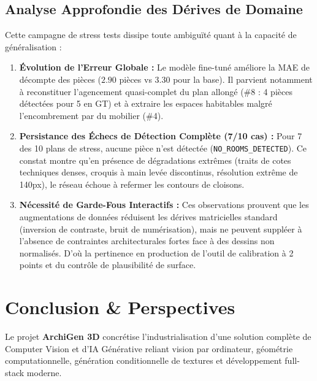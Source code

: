 \documentclass[11pt,a4paper]{report}
\begin{document}
\section{Analyse Approfondie des Dérives de Domaine}
Cette campagne de stress tests dissipe toute ambiguïté quant à la capacité de généralisation :
\begin{enumerate}
    \item \textbf{Évolution de l'Erreur Globale :} Le modèle fine-tuné améliore la MAE de décompte des pièces ($2.90$ pièces vs $3.30$ pour la base). Il parvient notamment à reconstituer l'agencement quasi-complet du plan allongé (\#8 : 4 pièces détectées pour 5 en GT) et à extraire les espaces habitables malgré l'encombrement par du mobilier (\#4).
    \item \textbf{Persistance des Échecs de Détection Complète (7/10 cas) :} Pour 7 des 10 plans de stress, aucune pièce n'est détectée (\texttt{NO\_ROOMS\_DETECTED}). Ce constat montre qu'en présence de dégradations extrêmes (traits de cotes techniques denses, croquis à main levée discontinus, résolution extrême de 140px), le réseau échoue à refermer les contours de cloisons.
    \item \textbf{Nécessité de Garde-Fous Interactifs :} Ces observations prouvent que les augmentations de données réduisent les dérives matricielles standard (inversion de contraste, bruit de numérisation), mais ne peuvent suppléer à l'absence de contraintes architecturales fortes face à des dessins non normalisés. D'où la pertinence en production de l'outil de calibration à 2 points et du contrôle de plausibilité de surface.
\end{enumerate}

\newpage

\chapter{Conclusion \& Perspectives}

Le projet \textbf{ArchiGen 3D} concrétise l'industrialisation d'une solution complète de Computer Vision et d'IA Générative reliant vision par ordinateur, géométrie computationnelle, génération conditionnelle de textures et développement full-stack moderne.
\end{document}
